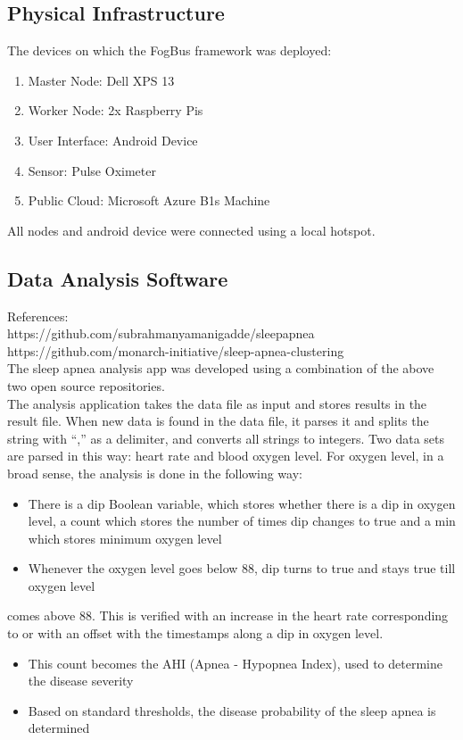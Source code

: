 \documentclass[AMA,STIX1COL]{WileyNJD-v2}
\begin{document}
\subsection{Physical Infrastructure}
The devices on which the FogBus framework was deployed:
\begin{enumerate}
\item Master Node: Dell XPS 13
\item Worker Node: 2x Raspberry Pis 
\item User Interface: Android Device
\item Sensor: Pulse Oximeter
\item Public Cloud: Microsoft Azure B1s Machine
\end{enumerate}
All nodes and android device were connected using a local hotspot.

\subsection{Data Analysis Software}
References: \\
https://github.com/subrahmanyamanigadde/sleepapnea \\
https://github.com/monarch-initiative/sleep-apnea-clustering \\
The sleep apnea analysis app was developed using a combination of the above two open source repositories.  \\
The analysis application takes the data file as input and stores results in the result file. When new data is found in the data file, it parses it and splits the string with “,” as a delimiter, and converts all strings to integers. Two data sets are parsed in this way: heart rate and blood oxygen level. For oxygen level, in a broad sense, the analysis is done in the following way: 
\begin{itemize}
\item There is a dip Boolean variable, which stores whether there is a dip in oxygen level, a count which stores the number of times dip changes to true and a min which stores minimum oxygen level 
\item Whenever the oxygen level goes below 88, dip turns to true and stays true till oxygen level 
\end{itemize}
comes above 88. This is verified with an increase in the heart rate corresponding to or with an offset with the timestamps along a dip in oxygen level.
\begin{itemize}
\item This count becomes the AHI (Apnea - Hypopnea Index), used to determine the disease severity
\item Based on standard thresholds, the disease probability of the sleep apnea is determined 
\end{itemize}
\end{document}
